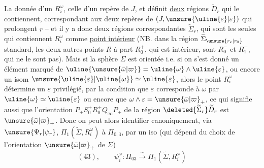 La donnée d'un $R_i^\omega$,  celle d'un repère  de $J$, et définit \uline{deux}  régions $\widetilde D_r$ qui le contiennent, correspondant aux deux repères de $(J,\unsure{\uline{\varepsilon}|\varepsilon})$ qui prolongent $r$ -- et il y a donc deux régions correspondantes $\widetilde\Sigma_r$, qui sont les seules qui contiennent $R_i^\omega$ comme \uline{point intérieur} (NB. dans la région $\widetilde\Sigma_{\unsure{r_\varepsilon|r_0}}$ standard, les deux autres points $R$ à part $R_0^+$, qui est intérieur, sont $R_0^-$ et $R_1^-$, qui ne le sont pas). Mais si la sphère $\Sigma$ est orientée i.e. si on s'est donné un élément marqué \inserted{$\unsure{\bar\omega|\varpi}_+$} de $\uline{\unsure{\bar\omega|\varpi}}=\uline{\omega}\wedge\uline{\varepsilon}$, ou encore un isom $\unsure{\uline{\varepsilon}|\uline{\omega}}\simeq\uline{\varepsilon}$, alors le point $R_i^\omega$ détermine un $\varepsilon$ \inserted{$\in\uline{\varepsilon}$} privilégié, par la condition que $\varepsilon$ corresponde à $\omega$ par $\uline{\omega}\simeq\uline{\varepsilon}$ ou encore que $\omega\wedge\varepsilon=\unsure{\bar\omega|\varpi}_+$, ce qui signifie aussi que l'orientation $P_+S_0^+R_0^+Q_\infty P_+$ de la région $\deleted{\widetilde\Sigma_r}\widetilde D_r$ est  $\unsure{\bar\omega|\varpi}_+$. Donc on peut alors identifier canoniquement, via $\unsure{\Psi_r|\psi_r}$, $\Pi_1(\widetilde\Sigma,R_i^\omega)$ à $\Pi_{0,3}$, par un iso (qui dépend du choix de l'orientation $\unsure{\bar\omega|\varpi}_+$ de $\Sigma$)
\[
(43),\qquad\psi_i^\omega:\Pi_{03}\xrightarrow{\sim}\Pi_1(\widetilde\Sigma,R_i^\omega)
\]
